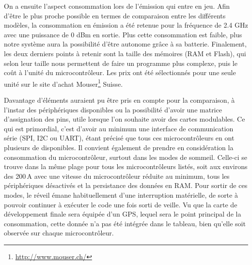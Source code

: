 On a ensuite l'aspect consommation lors de l'émission qui entre en jeu. Afin d'être le plus proche possible en termes de comparaison entre les différents modèles, la consommation en émission a été retenue pour la fréquence de 2.4 GHz avec une puissance de 0 dBm en sortie. Plus cette consommation est faible, plus notre système aura la possibilité d'être autonome grâce à sa batterie. Finalement, les deux derniers points à retenir sont la taille des mémoires (RAM et Flash), qui selon leur taille nous permettent de faire un programme plus complexe, puis le coût à l'unité du microcontrôleur. Les prix ont été sélectionnés pour une seule unité sur le site d'achat Mouser\footnote{\url{http://www.mouser.ch/}} Suisse. \,

Davantage d'éléments auraient pu être pris en compte pour la comparaison, à l'instar des périphériques disponibles ou la possibilité d'avoir une matrice d'assignation des pins, utile lorsque l'on souhaite avoir des cartes modulables. Ce qui est primordial, c'est d'avoir au minimum une interface de communication série (SPI, I2C ou UART), étant précisé que tous ces microcontrôleurs en ont plusieurs de disponibles. Il convient également de prendre en considération la consommation du microcontrôleur, surtout dans les modes de sommeil. Celle-ci se trouve dans la même plage pour tous les microcontrôleurs listés, soit aux environs des 200\,\si{\micro}A avec une vitesse du microcontrôleur réduite au minimum, tous les périphériques désactivés et la persistance des données en RAM. Pour sortir de ces modes, le réveil émane habituellement d'une interruption matérielle, de sorte à pouvoir continuer à exécuter le code une fois sorti de veille. Vu que la carte de développement finale sera équipée d'un GPS, lequel sera le point principal de la consommation, cette donnée n'a pas été intégrée dans le tableau, bien qu'elle soit observée sur chaque microcontrôleur.\\

